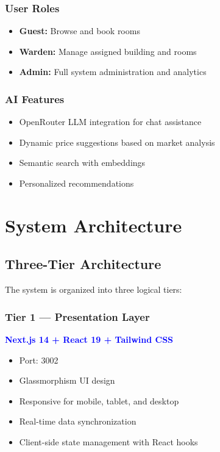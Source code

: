 \documentclass[12pt, a4paper, oneside]{report}
\begin{document}
\subsection{User Roles}
\begin{itemize}
  \item \textbf{Guest:} Browse and book rooms
  \item \textbf{Warden:} Manage assigned building and rooms
  \item \textbf{Admin:} Full system administration and analytics
\end{itemize}

\subsection{AI Features}
\begin{itemize}
  \item OpenRouter LLM integration for chat assistance
  \item Dynamic price suggestions based on market analysis
  \item Semantic search with embeddings
  \item Personalized recommendations
\end{itemize}

\chapter{System Architecture}

\section{Three-Tier Architecture}

The system is organized into three logical tiers:

\subsection{Tier 1 --- Presentation Layer}
\textcolor{Blue}{\textbf{Next.js 14 + React 19 + Tailwind CSS}}
\begin{itemize}
  \item Port: 3002
  \item Glassmorphism UI design
  \item Responsive for mobile, tablet, and desktop
  \item Real-time data synchronization
  \item Client-side state management with React hooks
\end{itemize}
\end{document}
